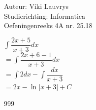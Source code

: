 \documentclass[a4paper]{article}
\begin{document}
  
\noindent \large Auteur: Viki	Lauvrys \\
\noindent \large Studierichting: Informatica\\
\noindent \large Oefeningenreeks 4A nr. 25.18\\

\medskip

\normalsize

$\displaystyle\int \dfrac{2x + 5}{x+3} dx $ \\

$ = \displaystyle\int \dfrac{2x +6 -1}{x+3} dx $ \\

$ = \displaystyle\int 2 dx - \displaystyle\int \dfrac{dx}{x+3}$ \\

$ = 2 x - \ln |x+3| + C$ \\


\begin{thebibliography}{999}
\end{thebibliography}
\end{document}
